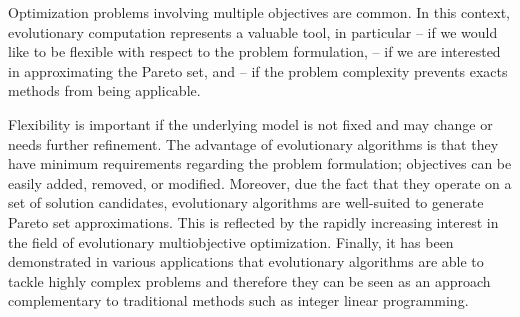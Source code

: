         Optimization problems involving multiple objectives are common. In this context, evolutionary computation represents a valuable tool, in particular 
        – if we would like to be flexible with respect to the problem formulation, 
        – if we are interested in approximating the Pareto set, and 
        – if the problem complexity prevents exacts methods from being applicable.

        Flexibility is important if the underlying model is not fixed and may change
        or needs further refinement. The advantage of evolutionary algorithms is that they have minimum requirements regarding the problem formulation; objectives can be easily added, removed, or modified. Moreover, due the fact that they operate on a set of solution candidates, evolutionary algorithms are well-suited to generate Pareto set approximations. This is reflected by the rapidly increasing interest in the field of evolutionary multiobjective optimization. Finally, it has been demonstrated in various applications that evolutionary algorithms are able to tackle highly complex problems and therefore they can be seen as an approach complementary to traditional methods such as integer linear programming.
